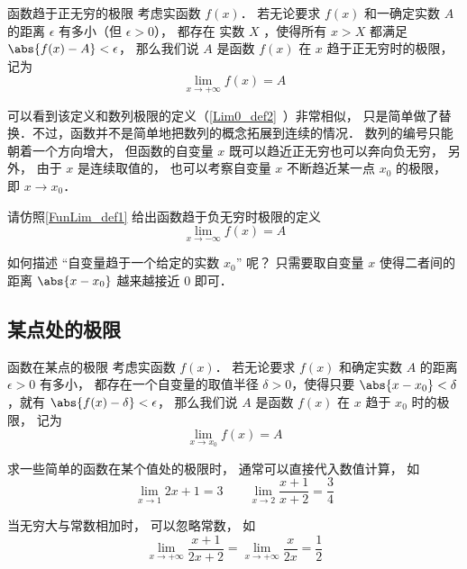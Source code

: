 \begin{definition}{函数趋于正无穷的极限}\label{FunLim_def1}
考虑实函数 $f(x)$． 若无论要求 $f(x)$ 和一确定实数 $A$ 的距离 $\epsilon$ 有多小（但 $\epsilon>0$）， 都存在 实数 $X$ ，使得所有 $x>X$ 都满足 $\abs{f(x)-A}<\epsilon$， 那么我们说 $A$ 是函数 $f(x)$ 在 $x$ 趋于正无穷时的极限， 记为
\begin{equation}
\lim\limits_{x\to +\infty} f(x) = A
\end{equation}
\end{definition}

可以看到该定义和数列极限的定义（\autoref{Lim0_def2}~）非常相似， 只是简单做了替换．不过，函数并不是简单地把数列的概念拓展到连续的情况． 数列的编号只能朝着一个方向增大， 但函数的自变量 $x$ 既可以趋近正无穷也可以奔向负无穷， 另外， 由于 $x$ 是连续取值的， 也可以考察自变量 $x$ 不断趋近某一点 $x_0$ 的极限， 即 $x\to x_0$．


\begin{exercise}{}
请仿照\autoref{FunLim_def1} 给出函数趋于负无穷时极限的定义
\begin{equation}
\lim\limits_{x\to -\infty} f(x) = A
\end{equation}
\end{exercise}

如何描述 “自变量趋于一个给定的实数 $x_0$” 呢？ 只需要取自变量 $x$ 使得二者间的距离 $\abs{x-x_0}$ 越来越接近 $0$ 即可．

\subsection{某点处的极限}
\begin{definition}{函数在某点的极限}\label{FunLim_def3}
考虑实函数 $f(x)$． 若无论要求 $f(x)$ 和确定实数 $A$ 的距离 $\epsilon>0$ 有多小， 都存在一个自变量的取值半径 $\delta>0$，使得只要 $\abs{x-x_0} < \delta$，就有 $\abs{f(x)-\delta}<\epsilon$，
那么我们说 $A$ 是函数 $f(x)$ 在 $x$ 趋于 $x_0$ 时的极限， 记为
\begin{equation}
\lim\limits_{x\to x_0}f(x)=A
\end{equation}
\end{definition}


\begin{example}{}
求一些简单的函数在某个值处的极限时， 通常可以直接代入数值计算， 如
\begin{equation}
\lim_{x\to 1} 2x + 1 = 3 \qquad \lim_{x\to 2}\frac{x + 1}{x + 2} = \frac34
\end{equation}

当无穷大与常数相加时， 可以忽略常数， 如
\begin{equation}
\lim_{x\to +\infty} \frac{x + 1}{2x + 2} = \lim_{x\to +\infty} \frac{x}{2x} = \frac12
\end{equation}
\end{example}

